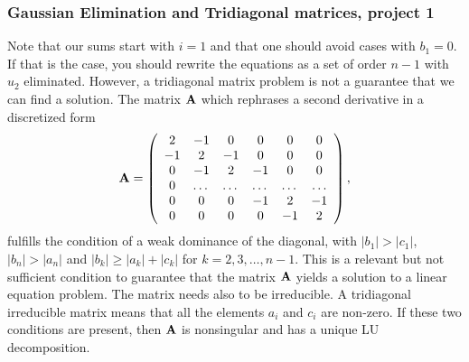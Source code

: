 \documentclass[compress]{beamer}
\begin{document}
\frame
{
  \frametitle{Gaussian Elimination and Tridiagonal matrices, project 1}
\begin{small}
{\scriptsize
Note that our sums start with $i=1$ and that one  should avoid cases with $b_1=0$. If that is the case, you should rewrite the equations
as a set of order $n-1$ with $u_2$ eliminated. However, a tridiagonal matrix problem is not a guarantee that we
can find a solution. The matrix ${\bf A}$ which rephrases a second derivative in a discretized form
\[
    {\bf A} = \left(\begin{array}{cccccc}
                          2 & -1 & 0 & 0  &0  & 0\\
                          -1 & 2 & -1 &0 &0 &0 \\
                          0 & -1 & 2 & -1 & 0& 0 \\
                          0 & \dots   & \dots & \dots   &\dots & \dots \\
                          0 &0   &0  &-1  &2& -1 \\
                          0 &  0  &0  &0   &-1 & 2 \\
                      \end{array} \right),
\]
fulfills the condition of a weak dominance of the diagonal, with
$|b_1| > |c_1|$, $|b_n| > |a_n|$ and  $|b_k| \ge |a_k|+|c_k|$ for $k=2,3,\dots,n-1$.
This is a relevant but not sufficient condition to guarantee that the matrix ${\bf A}$ yields a solution to a linear
equation problem. The matrix needs also to be irreducible. A tridiagonal irreducible matrix means that all the elements $a_i$ and
$c_i$ are non-zero. If these two conditions are present, then ${\bf A}$ is nonsingular and has a unique LU decomposition.
}
\end{small}
}
\end{document}
